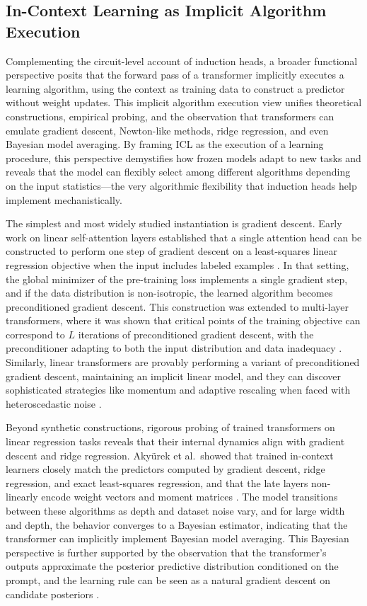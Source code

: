 \documentclass[11pt]{article}
\begin{document}
\subsection{In-Context Learning as Implicit Algorithm Execution}

Complementing the circuit-level account of induction heads, a broader functional perspective posits that the forward pass of a transformer implicitly executes a learning algorithm, using the context as training data to construct a predictor without weight updates. This implicit algorithm execution view unifies theoretical constructions, empirical probing, and the observation that transformers can emulate gradient descent, Newton-like methods, ridge regression, and even Bayesian model averaging. By framing ICL as the execution of a learning procedure, this perspective demystifies how frozen models adapt to new tasks and reveals that the model can flexibly select among different algorithms depending on the input statistics---the very algorithmic flexibility that induction heads help implement mechanistically.

The simplest and most widely studied instantiation is gradient descent. Early work on linear self-attention layers established that a single attention head can be constructed to perform one step of gradient descent on a least-squares linear regression objective when the input includes labeled examples \cite{ref55}. In that setting, the global minimizer of the pre-training loss implements a single gradient step, and if the data distribution is non-isotropic, the learned algorithm becomes preconditioned gradient descent. This construction was extended to multi-layer transformers, where it was shown that critical points of the training objective can correspond to \(L\) iterations of preconditioned gradient descent, with the preconditioner adapting to both the input distribution and data inadequacy \cite{ref56}. Similarly, linear transformers are provably performing a variant of preconditioned gradient descent, maintaining an implicit linear model, and they can discover sophisticated strategies like momentum and adaptive rescaling when faced with heteroscedastic noise \cite{ref15}.

Beyond synthetic constructions, rigorous probing of trained transformers on linear regression tasks reveals that their internal dynamics align with gradient descent and ridge regression. Akyürek et al.~showed that trained in-context learners closely match the predictors computed by gradient descent, ridge regression, and exact least-squares regression, and that the late layers non-linearly encode weight vectors and moment matrices \cite{ref5}. The model transitions between these algorithms as depth and dataset noise vary, and for large width and depth, the behavior converges to a Bayesian estimator, indicating that the transformer can implicitly implement Bayesian model averaging. This Bayesian perspective is further supported by the observation that the transformer's outputs approximate the posterior predictive distribution conditioned on the prompt, and the learning rule can be seen as a natural gradient descent on candidate posteriors \cite{ref57}.
\end{document}
